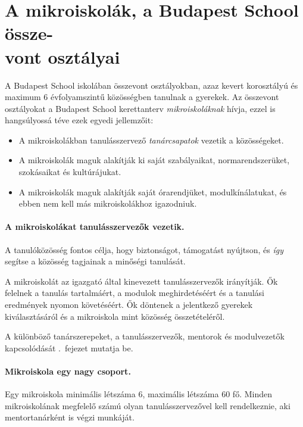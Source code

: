 \section{A mikroiskolák, a Budapest School össze-\\
  vont osztályai}
\label{sec:mikroiskola}

A Budapest School iskolában összevont osztályokban, azaz kevert korosztályú és maximum 6 évfolyamszintű közösségben tanulnak a gyerekek. Az összevont osztályokat a Budapest School kerettanterv \emph{mikroiskoláknak} hívja, ezzel is hangsúlyossá téve ezek egyedi jellemzőit:
\begin{itemize}
      \item A mikroiskolákban  tanulásszervező	\emph{tanárcsapatok} vezetik a közösségeket.
      \item A mikroiskolák maguk alakítják ki saját szabályaikat, normarendszerüket, szokásaikat és kultúrájukat.
      \item A mikroiskolák maguk alakítják saját órarendjüket, modulkínálatukat, és ebben nem kell más mikroiskolákhoz igazodniuk.
\end{itemize}

\paragraph{A mikroiskolákat tanulásszervezők vezetik.}

A tanulóközösség fontos\linebreak
célja, hogy biztonságot, támogatást nyújtson, és \emph{így} segítse a közösség tagjainak a minőségi tanulását.

A mikroiskolát az igazgató által kinevezett tanulásszervezők irányítják. Ők felelnek a tanulás tartalmáért, a modulok meghirdetéséért és a tanulási eredmények nyomon követéséért. Ők döntenek a jelentkező gyerekek kiválasztásáról és a mikroiskola mint közösség összetételéről.

A különböző tanárszerepeket, a tanulásszervezők, mentorok és modulvezetők kapcsolódását .~fejezet mutatja be.

\paragraph{Mikroiskola egy nagy csoport.}

Egy mikroiskola minimális létszáma 6, maximális létszáma 60 fő. Minden mikroiskolának megfelelő számú olyan tanulásszervezővel kell rendelkeznie, aki mentortanárként is végzi munkáját.

